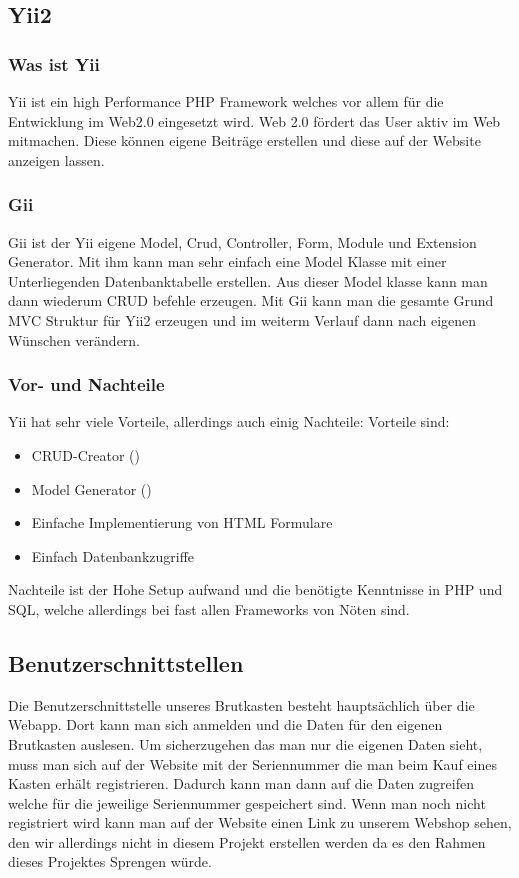 \subsection{Yii2} \label{sec:YII2}

\subsubsection{Was ist Yii}
Yii ist ein high Performance PHP Framework welches vor allem für die Entwicklung im Web2.0 eingesetzt wird. Web 2.0 fördert das User aktiv im Web mitmachen. Diese können eigene Beiträge erstellen und diese auf der Website anzeigen lassen.\cite{Web_2}

\subsubsection{Gii} \label{sec:gii}
Gii ist der Yii eigene Model, Crud, Controller, Form, Module und Extension Generator. Mit ihm kann man sehr einfach eine Model Klasse mit einer Unterliegenden Datenbanktabelle erstellen. Aus dieser Model klasse kann man dann wiederum CRUD befehle erzeugen. Mit Gii kann man die gesamte Grund MVC Struktur für Yii2 erzeugen und im weiterm Verlauf dann nach eigenen Wünschen verändern.

\subsubsection{Vor- und Nachteile}
Yii hat sehr viele Vorteile, allerdings auch einig Nachteile:
Vorteile sind:

\begin{itemize}
	\item CRUD-Creator ()
	\item Model Generator ()
	\item Einfache Implementierung von HTML Formulare
	\item Einfach Datenbankzugriffe
\end{itemize}

Nachteile ist der Hohe Setup aufwand und die benötigte Kenntnisse in PHP und SQL, welche allerdings bei fast allen Frameworks von Nöten sind.


\subsection{Benutzerschnittstellen} 

Die Benutzerschnittstelle unseres Brutkasten besteht hauptsächlich über die Webapp. Dort kann man sich anmelden und die Daten für den eigenen Brutkasten auslesen. Um sicherzugehen das man nur die eigenen Daten sieht, muss man sich auf der Website mit der Seriennummer die man beim Kauf eines Kasten erhält registrieren. Dadurch kann man dann auf die Daten zugreifen welche für die jeweilige Seriennummer gespeichert sind.
\newline
Wenn man noch nicht registriert wird kann man auf der Website einen Link zu unserem Webshop sehen, den wir allerdings nicht in diesem Projekt erstellen werden da es den Rahmen dieses Projektes Sprengen würde.
